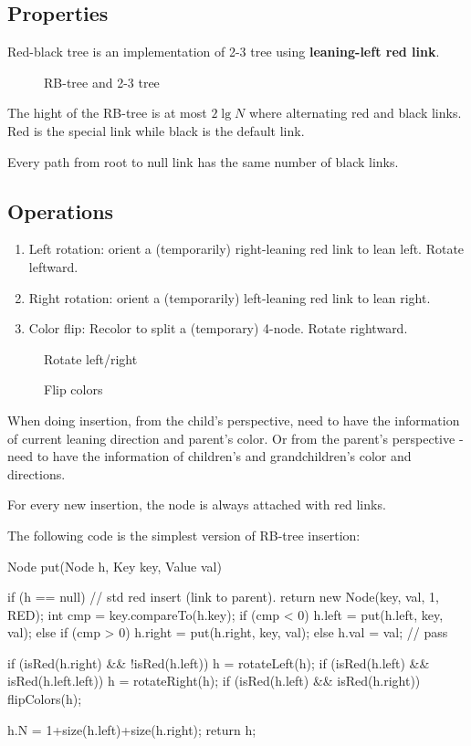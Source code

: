 \subsection{Properties}
Red-black tree is an implementation of 2-3 tree using \textbf{leaning-left red link}. \begin{figure}[hbtp]
\centering
{}
\caption{RB-tree and 2-3 tree}
\label{fig:LABEL}
\end{figure}
The hight of the RB-tree is at most $2\lg N$ where alternating red and black links. Red is the special link while black is the default link. 

Every path from root to null link has the same number of black links.
\subsection{Operations}
\begin{enumerate}
\item Left rotation: orient a (temporarily) right-leaning red link to lean left. Rotate leftward. 
\item Right rotation: orient a (temporarily) left-leaning red link to lean right. 
\item Color flip: Recolor to split a (temporary) 4-node. Rotate rightward. 
\end{enumerate}
\begin{figure}[hbtp]
\centering
{}
\caption{Rotate left/right}
\label{fig:LABEL}
\end{figure}

\begin{figure}[hbtp]
\centering
{}
\caption{Flip colors}
\label{fig:LABEL}
\end{figure}

 When doing insertion, from the child's perspective, need to have the information of current leaning direction and parent's color. Or from the parent's perspective - need to have the information of children's and grandchildren's color and directions.

For every new insertion, the node is always attached with red links. 

The following code is the simplest version of RB-tree insertion: 

\begin{java}
Node put(Node h, Key key, Value val) {
  if (h == null)  // std red insert (link to parent).
    return new Node(key, val, 1, RED);
  int cmp = key.compareTo(h.key);
  if      (cmp < 0) h.left  = put(h.left,  key, val);
  else if (cmp > 0) h.right = put(h.right, key, val);
  else h.val = val; // pass

  if (isRed(h.right) && !isRed(h.left))    h = rotateLeft(h);
  if (isRed(h.left) && isRed(h.left.left)) h = rotateRight(h);
  if (isRed(h.left) && isRed(h.right))     flipColors(h);

  h.N = 1+size(h.left)+size(h.right);
  return h; 
}
\end{java}


